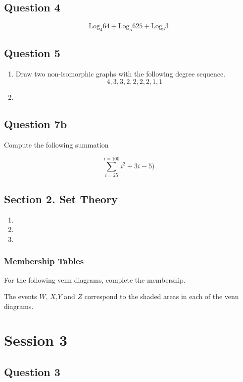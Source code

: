\documentclass[]{report}
\begin{document}
\section*{Question 4}
\[ \mbox{Log}_4 64 + \mbox{Log}_5 625 + \mbox{Log}_9 3 \] 


\section*{Question 5}
\begin{enumerate}
	\item Draw two non-isomorphic graphs with the following degree sequence.
	\[ 4,3,3,2,2,2,2,1,1\]
	\item
\end{enumerate}

\section*{Question 7b}

Compute the following summation

\[ \sum^{i=100}_{i=25} i^2 + 3i -5)\]



\section*{Section 2. Set Theory}

\begin{enumerate}
	\item
	\item
	\item
\end{enumerate}
\subsection*{Membership Tables}
For the following venn diagrams, complete the membership.

The events $W$, $X$,$Y$ and $Z$ correspond to the shaded areas in each of the venn diagrams.

\chapter{Session 3}
	\section*{Question 3}
\end{document}
